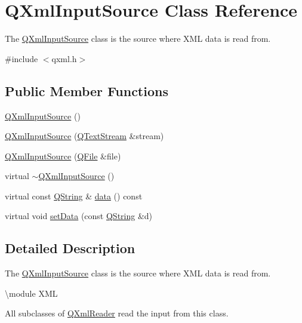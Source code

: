 \hypertarget{class_q_xml_input_source}{}\section{Q\+Xml\+Input\+Source Class Reference}
\label{class_q_xml_input_source}


The \mbox{\hyperlink{class_q_xml_input_source}{Q\+Xml\+Input\+Source}} class is the source where X\+ML data is read from.  




{\ttfamily \#include $<$qxml.\+h$>$}

\subsection*{Public Member Functions}
\begin{DoxyCompactItemize}
\item 
\mbox{\hyperlink{class_q_xml_input_source_ae01ad9dbd2e6d950fe4d43e7f7ba5e80}{Q\+Xml\+Input\+Source}} ()
\item 
\mbox{\hyperlink{class_q_xml_input_source_a301b2d54ab84af500ac65257de94f23d}{Q\+Xml\+Input\+Source}} (\mbox{\hyperlink{class_q_text_stream}{Q\+Text\+Stream}} \&stream)
\item 
\mbox{\hyperlink{class_q_xml_input_source_af31832f657ee461a8fbe9b9f9227c218}{Q\+Xml\+Input\+Source}} (\mbox{\hyperlink{class_q_file}{Q\+File}} \&file)
\item 
virtual \mbox{\hyperlink{class_q_xml_input_source_ac488a4e4c15218584c36c54bb4d4d78b}{$\sim$\+Q\+Xml\+Input\+Source}} ()
\item 
virtual const \mbox{\hyperlink{class_q_string}{Q\+String}} \& \mbox{\hyperlink{class_q_xml_input_source_a1e7d5502610edbceed00152d1787234f}{data}} () const
\item 
virtual void \mbox{\hyperlink{class_q_xml_input_source_a3ecfd199af8d72d33a9ef7b919794923}{set\+Data}} (const \mbox{\hyperlink{class_q_string}{Q\+String}} \&d)
\end{DoxyCompactItemize}


\subsection{Detailed Description}
The \mbox{\hyperlink{class_q_xml_input_source}{Q\+Xml\+Input\+Source}} class is the source where X\+ML data is read from. 

\textbackslash{}module X\+ML

All subclasses of \mbox{\hyperlink{class_q_xml_reader}{Q\+Xml\+Reader}} read the input from this class. 

